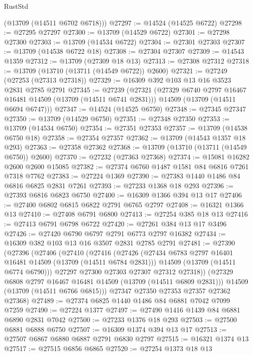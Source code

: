 \begin{lexlean}{RustStd}
\begin{coremodule}
      (@13709 (@14511 @6702 @6718)))
@27297 := @14524 (@14525 @6722)
@27298 := @27295 @27297
@27300 := @13709 (@14529 @6722)
@27301 := @27298 @27300
@27303 := @13709 (@14534 @6722)
@27304 := @27301 @27303
@27307 := @13709 (@14538 @6722 @18)
@27308 := @27304 @27307
@27309 := @14543 @1359
@27312 := @13709 (@27309 @18 @13)
@27313 := @27308 @27312
@27318 := @13709 (@13710 (@13711 (@14549 @6722)) @2600)
@27321 := @27249 (@27253 (@27313 @27318))
@27329 := @16309 @392 @103 @13 @16 @3523 @2831 @2785 @2791
@27345 := @27239
    (@27321
      (@27329 @6740 @2797 @16467 @16481 @14509 (@13709 (@14511 @6741 @2831)))
      @14509
      (@13709 (@14511 @6694 @6747)))
@27347 := @14524 (@14525 @6750)
@27348 := @27345 @27347
@27350 := @13709 (@14529 @6750)
@27351 := @27348 @27350
@27353 := @13709 (@14534 @6750)
@27354 := @27351 @27353
@27357 := @13709 (@14538 @6750 @18)
@27358 := @27354 @27357
@27362 := @13709 (@14543 @1357 @18 @293)
@27363 := @27358 @27362
@27368 := @13709 (@13710 (@13711 (@14549 @6750)) @2600)
@27370 := @27232 (@27363 @27368)
@27374 := @15081 @16282 @2600 @2600 @15085
@27382 := @27374 @6760 @1487 @1581 @84 @6816 @7261 @7318 @7762
@27383 := @27224 @1369
@27390 := @27383 @1440 @1486 @84 @6816 @6825 @2831 @7261
@27393 := @27233 @1368 @18 @293
@27396 := @27393 @6816 @6823 @6750
@27400 := @16309 @1366 @394 @13 @17
@27406 := @27400 @6802 @6815 @6822 @2791 @6765 @2797
@27408 := @16321 @1366 @13
@27410 := @27408 @6791 @6800
@27413 := @27254 @385 @18 @13
@27416 := @27413 @6791 @6798 @6722
@27420 := @27261 @384 @13 @17 @3496
@27426 := @27420 @6790 @6797 @2791 @6773 @2797 @16382
@27434 := @16309 @382 @103 @13 @16 @3507 @2831 @2785 @2791
@27481 := @27390
    (@27396
      (@27406
        (@27410
          (@27416
            (@27426
              (@27434 @6783 @2797 @16401 @16481 @14509 (@13709 (@14511 @6784 @2831)))
              @14509
              (@13709 (@14511 @6774 @6790)))
            @27297
            @27300
            @27303
            @27307
            @27312
            @27318))
        (@27329 @6808 @2797 @16467 @16481 @14509 (@13709 (@14511 @6809 @2831)))
        @14509
        (@13709 (@14511 @6766 @6815)))
      @27347
      @27350
      @27353
      @27357
      @27362
      @27368)
@27489 := @27374 @6825 @1440 @1486 @84 @6881 @7042 @7099 @7259
@27490 := @27224 @1377
@27497 := @27490 @1416 @1439 @84 @6881 @6890 @2831 @7042
@27500 := @27233 @1376 @18 @293
@27503 := @27500 @6881 @6888 @6750
@27507 := @16309 @1374 @394 @13 @17
@27513 := @27507 @6867 @6880 @6887 @2791 @6830 @2797
@27515 := @16321 @1374 @13
@27517 := @27515 @6856 @6865
@27520 := @27254 @1373 @18 @13

\end{coremodule}
\end{lexlean}
